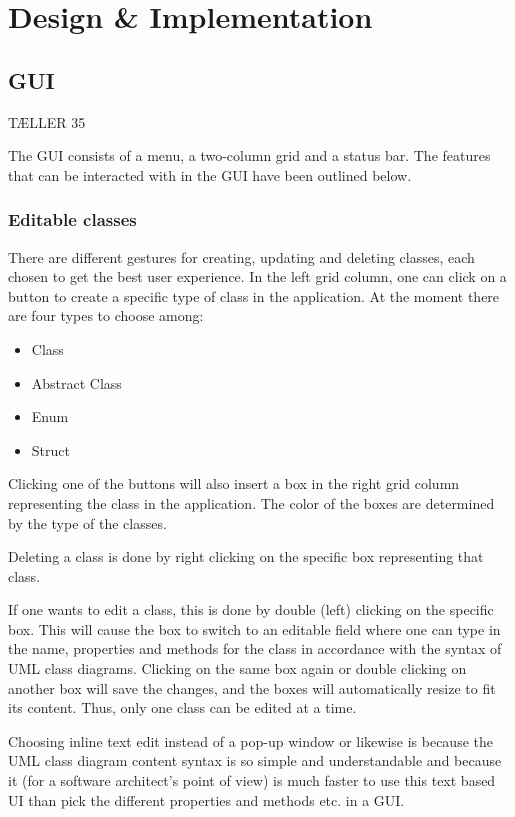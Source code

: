 \chapter{Design \& Implementation}
\label{sec:design_and_implementation}

\section{GUI}
\label{sec:gui}
TÆLLER 35

The GUI consists of a menu, a two-column grid and a status bar. The features that can be interacted with in the GUI have been outlined below.

\subsection{Editable classes}

There are different gestures for creating, updating and deleting classes, each chosen to get the best user experience. In the left grid column, one can click on a button to create a specific type of class in the application. At the moment there are four types to choose among:

\begin{itemize}
  \item Class
  \item Abstract Class
  \item Enum
  \item Struct
\end{itemize}

Clicking one of the buttons will also insert a box in the right grid column representing the class in the application. The color of the boxes are determined by the type of the classes.

Deleting a class is done by right clicking on the specific box representing that class.

If one wants to edit a class, this is done by double (left) clicking on the specific box. This will cause the box to switch to an editable field where one can type in the name, properties and methods for the class in accordance with the syntax of UML class diagrams. Clicking on the same box again or double clicking on another box will save the changes, and the boxes will automatically resize to fit its content. Thus, only one class can be edited at a time.

Choosing inline text edit instead of a pop-up window or likewise is because the UML class diagram content syntax is so simple and understandable and because it (for a software architect's point of view) is much faster to use this text based UI than pick the different properties and methods etc. in a GUI.

